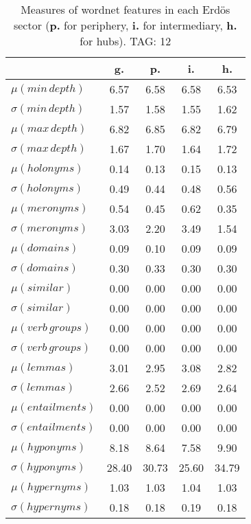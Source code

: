 \begin{table}[h!]
\begin{center}
\begin{tabular}{| l | c | c | c | c |}\hline
 & g. & p. & i. & h. \\\hline
$\mu(min\,depth)$ & 6.57  & 6.58  & 6.58  & 6.53 \\\hline
$\sigma(min\,depth)$ & 1.57  & 1.58  & 1.55  & 1.62 \\\hline
$\mu(max\,depth)$ & 6.82  & 6.85  & 6.82  & 6.79 \\\hline
$\sigma(max\,depth)$ & 1.67  & 1.70  & 1.64  & 1.72 \\\hline
$\mu(holonyms)$ & 0.14  & 0.13  & 0.15  & 0.13 \\\hline
$\sigma(holonyms)$ & 0.49  & 0.44  & 0.48  & 0.56 \\\hline
$\mu(meronyms)$ & 0.54  & 0.45  & 0.62  & 0.35 \\\hline
$\sigma(meronyms)$ & 3.03  & 2.20  & 3.49  & 1.54 \\\hline
$\mu(domains)$ & 0.09  & 0.10  & 0.09  & 0.09 \\\hline
$\sigma(domains)$ & 0.30  & 0.33  & 0.30  & 0.30 \\\hline
$\mu(similar)$ & 0.00  & 0.00  & 0.00  & 0.00 \\\hline
$\sigma(similar)$ & 0.00  & 0.00  & 0.00  & 0.00 \\\hline
$\mu(verb\,groups)$ & 0.00  & 0.00  & 0.00  & 0.00 \\\hline
$\sigma(verb\,groups)$ & 0.00  & 0.00  & 0.00  & 0.00 \\\hline
$\mu(lemmas)$ & 3.01  & 2.95  & 3.08  & 2.82 \\\hline
$\sigma(lemmas)$ & 2.66  & 2.52  & 2.69  & 2.64 \\\hline
$\mu(entailments)$ & 0.00  & 0.00  & 0.00  & 0.00 \\\hline
$\sigma(entailments)$ & 0.00  & 0.00  & 0.00  & 0.00 \\\hline
$\mu(hyponyms)$ & 8.18  & 8.64  & 7.58  & 9.90 \\\hline
$\sigma(hyponyms)$ & 28.40  & 30.73  & 25.60  & 34.79 \\\hline
$\mu(hypernyms)$ & 1.03  & 1.03  & 1.04  & 1.03 \\\hline
$\sigma(hypernyms)$ & 0.18  & 0.18  & 0.19  & 0.18 \\\hline
\end{tabular}
\caption{Measures of wordnet features in each Erd\"os sector ({{\bf p.}} for periphery, {{\bf i.}} for intermediary, {{\bf h.}} for hubs). TAG: 12}
\end{center}
\end{table}